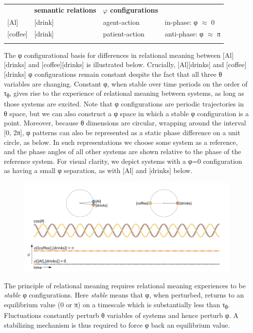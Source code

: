 \begin{tabularx}{\textwidth}{XXXX}
\lsptoprule
\multicolumn{2}{c}{\textbf{conceptual systems}} & \textbf{semantic relations} & \textbf{$\varphi$ configurations}\\{}
[Al] & [drink] & agent-action & in-phase: φ ${\approx}$ 0\\{}
[coffee] & [drink] & patient-action & anti-phase: φ ${\approx}$ π\\
\lspbottomrule
\end{tabularx}

  The φ configurational basis for differences in relational meaning between [Al][drinks] and [coffee][drinks] is illustrated below. Crucially, [Al][drinks] and [coffee][drinks] φ configurations remain constant despite the fact that all three θ variables are changing. Constant φ, when stable over time periods on the order of τ\textsubscript{θ}, gives rise to the experience of relational meaning between systems, as long as those systems are excited. Note that φ configurations are periodic trajectories in θ space, but we can also construct a φ space in which a stable φ configuration is a point. Moreover, because θ dimensions are circular, wrapping around the interval [0, 2π], φ patterns can also be represented as a static phase difference on a unit circle, as below. In such representations we choose some system as a reference, and the phase angles of all other systems are shown relative to the phase of the reference system. For visual clarity, we depict systems with a φ=0 configuration as having a small φ separation, as with [Al] and [drinks] below.

  
\begin{figure}
\includegraphics[width=\textwidth]{figures/Tilsen-img15.png}
\caption{\missingcaption}
\label{fig:}
\end{figure}
 

  The principle of relational meaning requires relational meaning experiences to be \textit{stable} φ configurations. Here \textit{stable} means that φ, when perturbed, returns to an equilibrium value (0 or π) on a timescale which is substantially less than τ\textsubscript{θ}. Fluctuations constantly perturb θ variables of systems and hence perturb φ. A stabilizing mechanism is thus required to force φ back an equilibrium value. 

